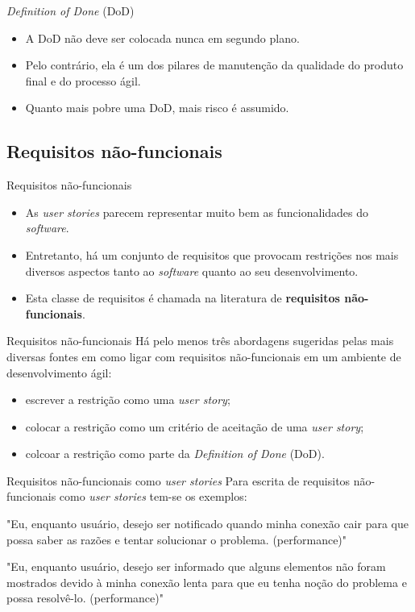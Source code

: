 \documentclass[11pt]{beamer}
\begin{document}
   \begin{frame}{\textit{Definition of Done} (DoD)}
      \begin{itemize}
         \item A DoD não deve ser colocada nunca em segundo plano.
         \item Pelo contrário, ela é um dos pilares de manutenção da qualidade do produto final e do processo ágil.
         \item Quanto mais pobre uma DoD, mais risco é assumido.
      \end{itemize}
   \end{frame}

   \subsection{Requisitos não-funcionais}

   \begin{frame}{Requisitos não-funcionais}
      \begin{itemize}
         \item As \textit{user stories} parecem representar muito bem as funcionalidades do \textit{software}.
         \item Entretanto, há um conjunto de requisitos que provocam restrições nos mais diversos aspectos tanto ao \textit{software} quanto ao seu desenvolvimento.
         \item Esta classe de requisitos é chamada na literatura de \textbf{requisitos não-funcionais}.
      \end{itemize}   
   \end{frame}

   \begin{frame}{Requisitos não-funcionais}
      Há pelo menos três abordagens sugeridas pelas mais diversas fontes em como ligar com requisitos não-funcionais em um ambiente de desenvolvimento ágil:
      \begin{itemize}
         \item escrever a restrição como uma \textit{user story};
         \item colocar a restrição como um critério de aceitação de uma \textit{user story};
         \item colcoar a restrição como parte da \textit{Definition of Done} (DoD).
      \end{itemize}   
   \end{frame}

   \begin{frame}{Requisitos não-funcionais como \textit{user stories}}
      Para escrita de requisitos não-funcionais como \textit{user stories} tem-se os exemplos:
\vspace{1cm}       

      "Eu, enquanto usuário, desejo ser notificado quando minha conexão cair para que possa saber as razões e tentar solucionar o problema. (performance)"
\vspace{1cm}
      
      "Eu, enquanto usuário, desejo ser informado que alguns elementos não foram mostrados devido à minha conexão lenta para que eu tenha noção do problema e possa resolvê-lo. (performance)"
   \end{frame}
\end{document}

